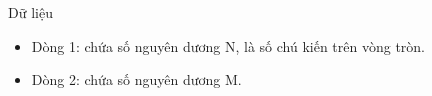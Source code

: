 Dữ liệu
\begin{itemize}
	\item     Dòng 1: chứa số nguyên dương N, là số chú kiến trên vòng tròn.   
	\item     Dòng 2: chứa số nguyên dương M.   
\end{itemize}